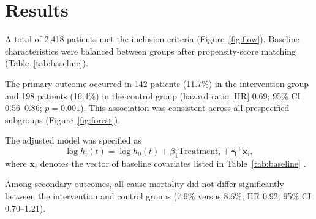 \section{Results}
\label{sec:results}

A total of 2,418 patients met the inclusion criteria (Figure~\ref{fig:flow}). Baseline characteristics were balanced between groups after propensity-score matching \cite{austin2011introduction} (Table~\ref{tab:baseline}).

The primary outcome occurred in 142 patients (11.7\%) in the intervention group and 198 patients (16.4\%) in the control group (hazard ratio [HR] 0.69; 95\% CI 0.56--0.86; $p = 0.001$). This association was consistent across all prespecified subgroups (Figure~\ref{fig:forest}).

The adjusted model was specified as
\begin{equation}
  \log h_i(t) = \log h_0(t) + \beta_1 \text{Treatment}_i + \boldsymbol{\gamma}^\top \mathbf{x}_i ,
  \label{eq:cox}
\end{equation}
where $\mathbf{x}_i$ denotes the vector of baseline covariates listed in Table~\ref{tab:baseline} \cite{cox1972regression, therneau2000modeling}.

Among secondary outcomes, all-cause mortality did not differ significantly between the intervention and control groups (7.9\% versus 8.6\%; HR 0.92; 95\% CI 0.70--1.21).
